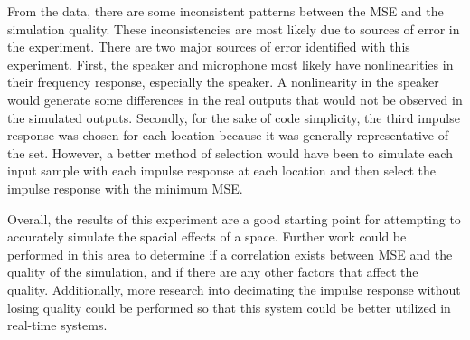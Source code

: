 \documentclass[letterpaper, 11pt, onecolumn, oneside]{article}
\begin{document}
From the data, there are some inconsistent patterns between the MSE and the simulation quality.
These inconsistencies are most likely due to sources of error in the experiment.
There are two major sources of error identified with this experiment.
First, the speaker and microphone most likely have nonlinearities in their frequency response, especially the speaker.
A nonlinearity in the speaker would generate some differences in the real outputs that would not be observed in the simulated outputs.
Secondly, for the sake of code simplicity, the third impulse response was chosen for each location because it was generally representative of the set.
However, a better method of selection would have been to simulate each input sample with each impulse response at each location and then select the impulse response with the minimum MSE.

Overall, the results of this experiment are a good starting point for attempting to accurately simulate the spacial effects of a space.
Further work could be performed in this area to determine if a correlation exists between MSE and the quality of the simulation, and if there are any other factors that affect the quality.
Additionally, more research into decimating the impulse response without losing quality could be performed so that this system could be better utilized in real-time systems.
\end{document}
